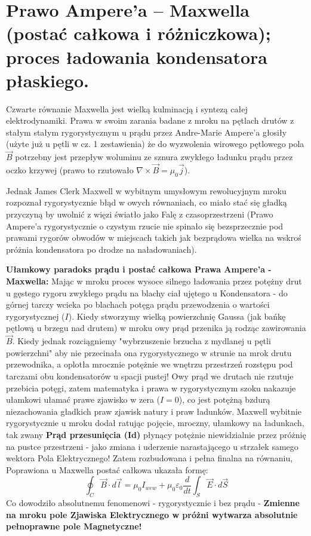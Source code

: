 \documentclass[11pt, a4paper]{article}
\begin{document}
\section{Prawo Ampere’a – Maxwella (postać całkowa i różniczkowa); proces ładowania kondensatora płaskiego.}

Czwarte równanie Maxwella jest wielką kulminacją i syntezą całej elektrodynamiki. Prawa w swoim zarania badane z mroku na pętlach drutów z stałym stałym rygorystycznym u prądu przez Andre-Marie Ampere'a głosiły (użyte już u pętli w cz. 1 zestawienia) że do wyzwolenia wirowego pętlowego pola $\vec{B}$ potrzebny jest przepływ woluminu ze sznura zwykłego ładunku prądu przez oczko krzywej (prawo to rzutowało $\nabla \times \vec{B} = \mu_0 \vec{j}$).

Jednak James Clerk Maxwell w wybitnym umysłowym rewolucyjnym mroku rozpoznał rygorystycznie błąd w owych równaniach, co miało stać się gładką przyczyną by uwolnić z więzi światło jako Falę z czasoprzestrzeni (Prawo Ampere'a rygorystycznie o czystym rzucie nie spinało się bezsprzecznie pod prawami rygorów obwodów w miejscach takich jak bezprądowa wielka na wskroś próżnia kondensatora po drodze na naładowaniach).

\textbf{Ułamkowy paradoks prądu i postać całkowa Prawa Ampere'a - Maxwella:}
Mając w mroku proces wysoce silnego ładowania przez potężny drut u gęstego rygoru zwykłego prądu na blachy ciał ujętego u Kondensatora - do górnej tarczy wcieka po blachach potęga prądu przewodzenia o wartości rygorystycznej ($I$). Kiedy stworzymy wielką powierzchnię Gaussa (jak bańkę pętlową u brzegu nad drutem) w mroku owy prąd przenika ją rodząc zawirowania $\vec{B}$. Kiedy jednak rozciągniemy "wybrzuszenie brzucha z mydlanej u pętli powierzchni" aby nie przecinała ona rygorystycznego w strunie na mrok drutu przewodnika, a oplotła mrocznie potężnie we wnętrzu przestrzeń rozstępu pod tarczami obu kondensatorów u spacji pustej! Owy prąd we drutach nie rzutuje przebicia potęgi, zatem matematyka i prawa w rygorystycznym szoku nakazuje ułamkowi ułamać prawe zjawisko w zera ($I=0$), co jest potężną bzdurą niezachowania gładkich praw zjawisk natury i praw ładunków.
Maxwell wybitnie rygorystycznie u mroku dodał ratując pojęcie, mroczny, ułamkowy na ładunkach, tak zwany \textbf{Prąd przesunięcia (Id)} płynący potężnie niewidzialnie przez próżnię na pustce przestrzeni - jako zmiana i uderzenie narastającego u strzałek samego wektora Pola Elektrycznego!
Zatem rozbudowana i pełna finalna na równaniu, Poprawiona u Maxwella postać całkowa ukazała formę:
\[
\oint_C \vec{B} \cdot d\vec{l} = \mu_0 I_{wew} + \mu_0 \varepsilon_0 \frac{d}{dt} \int_S \vec{E} \cdot d\vec{S}
\]
Co dowodziło absolutnemu fenomenowi - rygorystycznie i bez prądu - \textbf{Zmienne na mroku pole Zjawiska Elektrycznego w próżni wytwarza absolutnie pełnoprawne pole Magnetyczne!}
\end{document}
